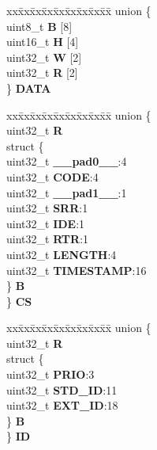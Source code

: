 \begin{DoxyCompactItemize}
\begin{tabbing}
\end{tabbing}\item 
\mbox{\label{structFLEXCAN__tag_1_1canbuf__t_a86bcecbb6b62d770f46803064cad5add}} 
\begin{tabbing}
xx\=xx\=xx\=xx\=xx\=xx\=xx\=xx\=xx\=\kill
union \{\\
\>uint8\_t {\bfseries B} \mbox{[}8\mbox{]}\\
\>uint16\_t {\bfseries H} \mbox{[}4\mbox{]}\\
\>uint32\_t {\bfseries W} \mbox{[}2\mbox{]}\\
\>uint32\_t {\bfseries R} \mbox{[}2\mbox{]}\\
\} {\bfseries DATA}\\

\end{tabbing}\item 
\mbox{\label{structFLEXCAN__tag_1_1canbuf__t_a34d400c6ce0872e13a0de32a75d93820}} 
\begin{tabbing}
xx\=xx\=xx\=xx\=xx\=xx\=xx\=xx\=xx\=\kill
union \{\\
\>uint32\_t {\bfseries R}\\
\>struct \{\\
\>\>uint32\_t {\bfseries \_\_pad0\_\_}:4\\
\>\>uint32\_t {\bfseries CODE}:4\\
\>\>uint32\_t {\bfseries \_\_pad1\_\_}:1\\
\>\>uint32\_t {\bfseries SRR}:1\\
\>\>uint32\_t {\bfseries IDE}:1\\
\>\>uint32\_t {\bfseries RTR}:1\\
\>\>uint32\_t {\bfseries LENGTH}:4\\
\>\>uint32\_t {\bfseries TIMESTAMP}:16\\
\>\} {\bfseries B}\\
\} {\bfseries CS}\\

\end{tabbing}\item 
\mbox{\label{structFLEXCAN__tag_1_1canbuf__t_ae168a59a002b27e3e6a8613336d14212}} 
\begin{tabbing}
xx\=xx\=xx\=xx\=xx\=xx\=xx\=xx\=xx\=\kill
union \{\\
\>uint32\_t {\bfseries R}\\
\>struct \{\\
\>\>uint32\_t {\bfseries PRIO}:3\\
\>\>uint32\_t {\bfseries STD\_ID}:11\\
\>\>uint32\_t {\bfseries EXT\_ID}:18\\
\>\} {\bfseries B}\\
\} {\bfseries ID}\\


\end{tabbing}
\end{DoxyCompactItemize}
